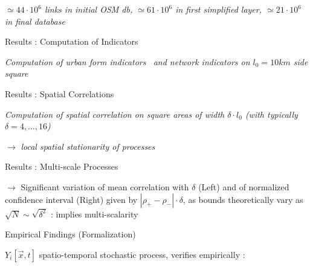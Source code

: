    \textit{$\simeq 44\cdot 10^6$ links in initial OSM db, $\simeq 61\cdot 10^6$ in first simplified layer, $\simeq 21\cdot 10^6$ in final database}







Results : Computation of Indicators


\textit{Computation of urban form indicators~\cite{le2015forme} and network indicators on $l_0=10km$ side square}





Results : Spatial Correlations

\textit{Computation of spatial correlation on square areas of width $\delta\cdot l_0$ (with typically $\delta = 4, \ldots , 16$)}



$\rightarrow$ \textit{local spatial stationarity of processes}



% 



Results : Multi-scale Processes

\medskip

$\rightarrow$ Significant variation of mean correlation with $\delta$ (Left) and of normalized confidence interval (Right) given by $\left|\rho_+ - \rho_-\right|\cdot \delta$, as bounds theoretically vary as $\sqrt{N} \sim \sqrt{\delta^2}$ : implies multi-scalarity






Empirical Findings (Formalization)

$Y_i\left[\vec{x},t\right]$ spatio-temporal stochastic process, verifies empirically :

